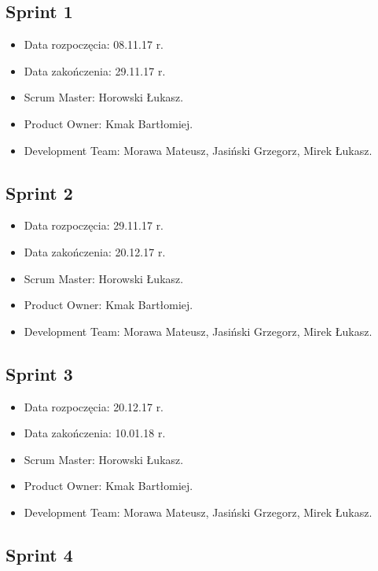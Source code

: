 \documentclass[a4paper]{article}
\begin{document}
\subsection{Sprint 1}

\begin{itemize}
\item Data rozpoczęcia: 08.11.17 r.
\item Data zakończenia: 29.11.17 r.
\item Scrum Master: Horowski Łukasz.
\item Product Owner: Kmak Bartłomiej.
\item Development Team: Morawa Mateusz, Jasiński Grzegorz, Mirek Łukasz.
\end{itemize}

\subsection{Sprint 2}

\begin{itemize}
\item Data rozpoczęcia: 29.11.17 r.
\item Data zakończenia: 20.12.17 r.
\item Scrum Master: Horowski Łukasz.
\item Product Owner: Kmak Bartłomiej.
\item Development Team: Morawa Mateusz, Jasiński Grzegorz, Mirek Łukasz.
\end{itemize}

\subsection{Sprint 3}

\begin{itemize}
\item Data rozpoczęcia: 20.12.17 r.
\item Data zakończenia: 10.01.18 r.
\item Scrum Master: Horowski Łukasz.
\item Product Owner: Kmak Bartłomiej.
\item Development Team: Morawa Mateusz, Jasiński Grzegorz, Mirek Łukasz.
\end{itemize}

\subsection{Sprint 4}
\end{document}
